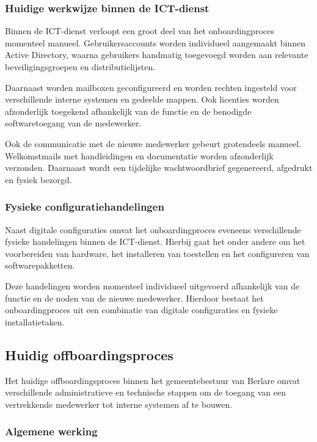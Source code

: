 \subsubsection{Huidige werkwijze binnen de ICT-dienst}

Binnen de ICT-dienst verloopt een groot deel van het onboardingproces momenteel manueel. Gebruikersaccounts worden individueel aangemaakt binnen Active Directory, waarna gebruikers handmatig toegevoegd worden aan relevante beveiligingsgroepen en distributielijsten.

Daarnaast worden mailboxen geconfigureerd en worden rechten ingesteld voor verschillende interne systemen en gedeelde mappen. Ook licenties worden afzonderlijk toegekend afhankelijk van de functie en de benodigde softwaretoegang van de medewerker.

Ook de communicatie met de nieuwe medewerker gebeurt grotendeels manueel. Welkomstmails met handleidingen en documentatie worden afzonderlijk verzonden. Daarnaast wordt een tijdelijke wachtwoordbrief gegenereerd, afgedrukt en fysiek bezorgd.

\subsubsection{Fysieke configuratiehandelingen}

Naast digitale configuraties omvat het onboardingproces eveneens verschillende fysieke handelingen binnen de ICT-dienst. Hierbij gaat het onder andere om het voorbereiden van hardware, het installeren van toestellen en het configureren van softwarepakketten.

Deze handelingen worden momenteel individueel uitgevoerd afhankelijk van de functie en de noden van de nieuwe medewerker. Hierdoor bestaat het onboardingproces uit een combinatie van digitale configuraties en fysieke installatietaken.

\subsection{Huidig offboardingsproces}

Het huidige offboardingsproces binnen het gemeentebestuur van Berlare omvat verschillende administratieve en technische stappen om de toegang van een vertrekkende medewerker tot interne systemen af te bouwen.

\subsubsection{Algemene werking}

